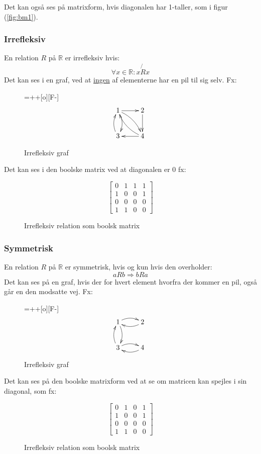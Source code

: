 \documentclass[a4paper]{article}
\begin{document}
    Det kan også ses på matrixform, hvis diagonalen har 1-taller, som i figur (\ref{fig:bm1}).
  \subsubsection{Irrefleksiv}
    En relation $R$ på $\mathbb{R}$ er irrefleksiv hvis:
    \begin{equation}
      \forall x \in \mathbb{R}: x\not{R}x %
    \end{equation}
    Det kan ses i en graf, ved at \underline{ingen} af elementerne har en pil til sig selv. Fx:
  \begin{figure}[H]
    \entrymodifiers={++[o][F-]}
    $$
    \xymatrix @-0pc {
      1 \ar[r] \ar@/^/[d] \ar@/^/[dr] & 2 \ar[d] \\
      3 \ar@/^/[u] &  4 \ar[l] \ar@/^/[lu]}
      $$
    \caption{Irrefleksiv graf} \label{fig:xy2}
  \end{figure}
  Det kan ses i den boolske matrix ved at diagonalen er $0$ fx:
  \begin{figure}[H]
    $$
    \begin{bmatrix}
      0 & 1 & 1 & 1 \\
      1 & 0 & 0 & 1 \\
      0 & 0 & 0 & 0 \\
      1 & 1 & 0 & 0
    \end{bmatrix}
    $$
    \caption{Irrefleksiv relation som boolsk matrix} \label{fig:bm2}
  \end{figure}
  \subsubsection{Symmetrisk}
    En relation $R$ på $\mathbb{R}$ er symmetrisk, hvis og kun hvis den overholder:
    \begin{equation}
      aRb \Rightarrow bRa
    \end{equation}
    Det kan ses på en graf, hvis der for hvert element hvorfra der kommer en pil, også går en den modsatte vej. Fx:
    \begin{figure}[H]
      \entrymodifiers={++[o][F-]}
      $$
      \xymatrix @-0pc {
        1 \ar@/^/[r] \ar@/^/[d]  & 2 \ar@/^/[l] \\
        3 \ar@/^/[u] \ar@/^/[r] &  4 \ar@/^/[l]  }
        $$
      \caption{Irrefleksiv graf} \label{fig:xy3}
    \end{figure}
    Det kan ses på den boolske matrixform ved at se om matricen kan spejles i sin diagonal, som fx:
    \begin{figure}[H]
      $$
      \begin{bmatrix}
        0 & 1 & 0 & 1 \\
        1 & 0 & 0 & 1 \\
        0 & 0 & 0 & 0 \\
        1 & 1 & 0 & 0
      \end{bmatrix}
      $$
      \caption{Irrefleksiv relation som boolsk matrix} \label{fig:bm3}
    \end{figure}
\end{document}
